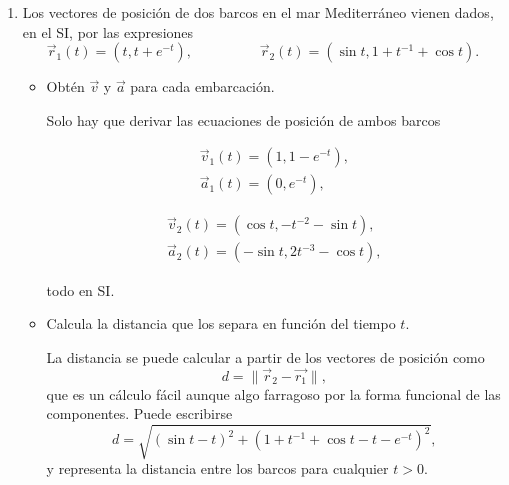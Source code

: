 \documentclass[a4paper,14pt]{extarticle}
\begin{document}
\begin{enumerate}
    \newpage
    \item Los vectores de posición de dos barcos en el mar Mediterráneo vienen dados, en el {\small SI}, por las expresiones
    \[\vec{r}_1(t)=(t,t+e^{-t}),\hspace{2cm}\vec{r}_2(t)=\left(\sin t,1+t^{-1}+\cos t\right).\]
    	\begin{itemize}
    		\item[a)] Obtén $\vec{v}$ y $\vec{a}$  para cada embarcación.
    		\begin{mdframed}[backgroundcolor=yellow!20]  
    			Solo hay que derivar las ecuaciones de posición de ambos barcos
    			\begin{minipage}{.5\textwidth}
    				\begin{align*}
    					\vec{v}_1(t)=\left(1,1-e^{-t}\right),\\
    					\vec{a}_1(t)=\left(0,e^{-t}\right),
    				\end{align*}
    			\end{minipage}\hfill
    			\begin{minipage}{.5\textwidth}
    				\begin{align*}
    					\vec{v}_2(t)=\left(\cos t,-t^{-2}-\sin t\right),\\
    					\vec{a}_2(t)=\left(-\sin t,2t^{-3}-\cos t\right),
    				\end{align*}
    			\end{minipage}
    			\vspace{1ex}
    			
    			todo en {\small SI}.
    		\end{mdframed}
    		\item[b)] Calcula la distancia que los separa en función del tiempo $t$.
    		\begin{mdframed}[backgroundcolor=yellow!20]  
    		La distancia se puede calcular a partir de los vectores de posición como
    		\[d=\|\vec{r}_2-\vec{r_1}\|,\]
    		que es un cálculo fácil aunque algo farragoso por la forma funcional de las componentes.
    		Puede escribirse
    		\[d=\sqrt{\left(\sin t-t\right)^2+\left(1+t^{-1}+\cos t-t-e^{-t}\right)^2},\]
    		y representa la distancia entre los barcos para cualquier $t>0$.
    		\end{mdframed}
    	\end{itemize}
    
\end{enumerate}
\end{document}
